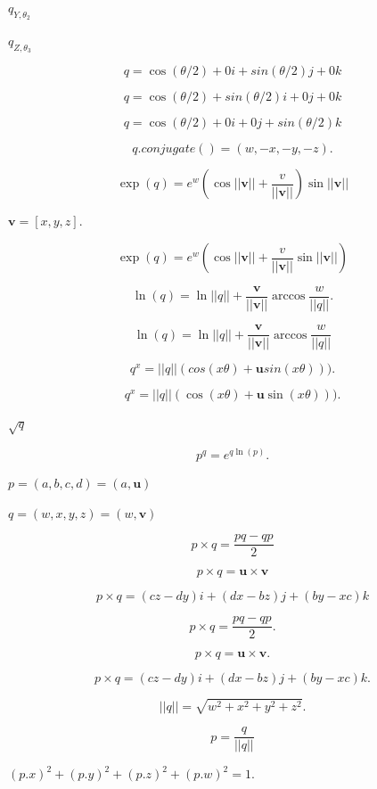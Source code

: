 \documentclass{article}
\begin{document}
$ q_{Y, \theta_2} $
\pagebreak

$ q_{Z, \theta_3} $
\pagebreak

\[q = \cos(\theta/2)+0 i+ sin(\theta/2) j +0k \]
\pagebreak

\[q = \cos(\theta/2)+sin(\theta/2) i +0 j +0 k \]
\pagebreak

\[q = \cos(\theta/2)+0 i +0 j +sin(\theta/2) k \]
\pagebreak

\[q.conjugate() = (w, -x, -y, -z).\]
\pagebreak

\[\exp(q) = e^w (\cos||\boldsymbol{v}||+ \frac{v}{||\boldsymbol{v}||})\sin||\boldsymbol{v}||\]
\pagebreak

$\boldsymbol{v} = [x, y, z].$
\pagebreak

\[\exp(q) = e^w (\cos||\boldsymbol{v}||+ \frac{v}{||\boldsymbol{v}||}\sin||\boldsymbol{v}||)\]
\pagebreak

\[\ln(q) = \ln||q|| + \frac{\boldsymbol{v}}{||\boldsymbol{v}||}\arccos\frac{w}{||q||}.\]
\pagebreak

\[\ln(q) = \ln||q|| + \frac{\boldsymbol{v}}{||\boldsymbol{v}||}\arccos\frac{w}{||q||}\]
\pagebreak

\[q^x = ||q||(cos(x\theta) + \boldsymbol{u}sin(x\theta))).\]
\pagebreak

\[q^x = ||q||(\cos(x\theta) + \boldsymbol{u}\sin(x\theta))).\]
\pagebreak

$\sqrt{q}$
\pagebreak

\[p^q = e^{q\ln(p)}.\]
\pagebreak

$p = (a, b, c, d) = (a, \boldsymbol{u})$
\pagebreak

$q = (w, x, y, z) = (w, \boldsymbol{v})$
\pagebreak

\[p \times q = \frac{pq- qp}{2}\]
\pagebreak

\[p \times q = \boldsymbol{u} \times \boldsymbol{v}\]
\pagebreak

\[p \times q = (cz-dy)i + (dx-bz)j + (by-xc)k \]
\pagebreak

\[p \times q = \frac{pq- qp}{2}.\]
\pagebreak

\[p \times q = \boldsymbol{u} \times \boldsymbol{v}.\]
\pagebreak

\[p \times q = (cz-dy)i + (dx-bz)j + (by-xc)k. \]
\pagebreak

\[||q|| = \sqrt{w^2 + x^2 + y^2 + z^2}.\]
\pagebreak

\[p = \frac{q}{||q||}\]
\pagebreak

$(p.x)^2 + (p.y)^2 + (p.z)^2 + (p.w)^2 = 1.$
\pagebreak
\end{document}

